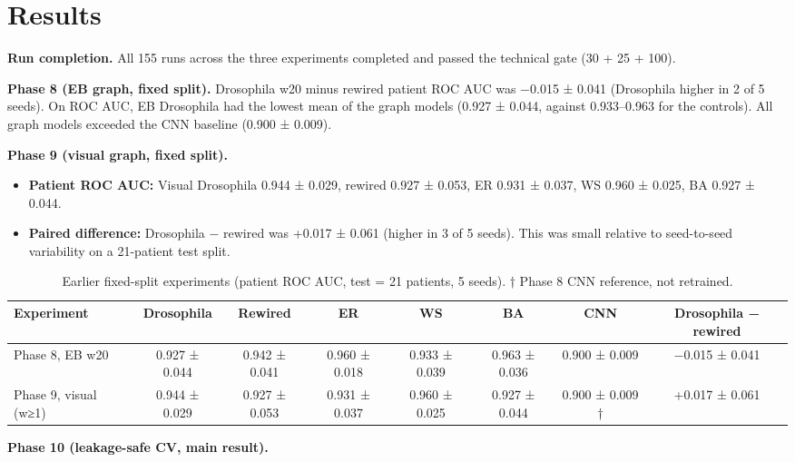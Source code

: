 \section{Results}
\label{sec:05_results}

\textbf{Run completion.} All 155 runs across the three experiments completed and passed the technical gate (30 + 25 + 100).

\textbf{Phase 8 (EB graph, fixed split).} Drosophila w20 minus rewired patient ROC AUC was −0.015 ± 0.041 (Drosophila higher in 2 of 5 seeds). On ROC AUC, EB Drosophila had the lowest mean of the graph models (0.927 ± 0.044, against 0.933–0.963 for the controls). All graph models exceeded the CNN baseline (0.900 ± 0.009).

\textbf{Phase 9 (visual graph, fixed split).}

\begin{itemize}
\item \textbf{Patient ROC AUC:} Visual Drosophila 0.944 ± 0.029, rewired 0.927 ± 0.053, ER 0.931 ± 0.037, WS 0.960 ± 0.025, BA 0.927 ± 0.044.
\item \textbf{Paired difference:} Drosophila − rewired was +0.017 ± 0.061 (higher in 3 of 5 seeds). This was small relative to seed-to-seed variability on a 21-patient test split.
\end{itemize}

\begin{table}[!t]
\centering
\footnotesize
\caption{Earlier fixed-split experiments (patient ROC AUC, test = 21 patients, 5 seeds). † Phase 8 CNN reference, not retrained.}
\label{tab:S1}
\begin{tabular}{lccccccc}
\toprule
\textbf{Experiment} & \textbf{Drosophila} & \textbf{Rewired} & \textbf{ER} & \textbf{WS} & \textbf{BA} & \textbf{CNN} & \textbf{Drosophila − rewired} \\
\midrule
Phase 8, EB w20 & 0.927 ± 0.044 & 0.942 ± 0.041 & 0.960 ± 0.018 & 0.933 ± 0.039 & 0.963 ± 0.036 & 0.900 ± 0.009 & −0.015 ± 0.041 \\
Phase 9, visual (w≥1) & 0.944 ± 0.029 & 0.927 ± 0.053 & 0.931 ± 0.037 & 0.960 ± 0.025 & 0.927 ± 0.044 & 0.900 ± 0.009 † & +0.017 ± 0.061 \\
\bottomrule
\end{tabular}
\end{table}

\textbf{Phase 10 (leakage-safe CV, main result).}

